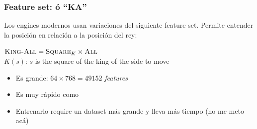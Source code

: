 \begin{frame}
\frametitle{Feature set:  ó \enquote{KA}}

Los engines modernos usan variaciones del siguiente feature set. Permite entender la posición en relación a la posición del rey:

\begin{center}
    $\textsc{King-All} = \textsc{Square}_{K} \times \textsc{All}$ \\
    $K(s)$: $s$ is the square of the king of the side to move\\
\end{center}

\begin{itemize}
    \item<2-> Es grande: $64 \times 768 = 49152$ \textit{features}
    \item<3-> Es muy rápido como 
    \item<4-> Entrenarlo require un dataset más grande y lleva más tiempo (no me meto acá)
\end{itemize}

\end{frame}
